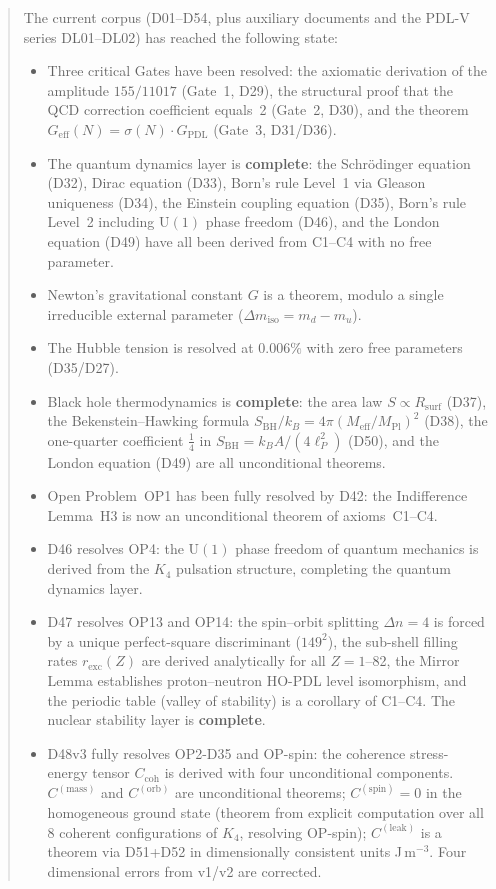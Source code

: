 \documentclass[11pt,a4paper]{article}
\theoremstyle{plain}
\theoremstyle{definition}
\theoremstyle{remark}
\newcommand{\Kfour}{K_4}
\newcommand{\Geff}{G_{\mathrm{eff}}}
\newcommand{\GPDL}{G_{\mathrm{PDL}}}
\newcommand{\Rsurf}{R_{\mathrm{surf}}}
\newcommand{\sigmaN}{\sigma(N)}
\newcommand{\SBH}{S_{\mathrm{BH}}}
\newcommand{\Meff}{M_{\mathrm{eff}}}
\newcommand{\MPl}{M_{\mathrm{Pl}}}
\newcommand{\Ccoh}{C_{\mathrm{coh}}}
\begin{document}
\begin{abstract}
The current corpus (D01--D54, plus auxiliary documents and the PDL-V series DL01--DL02) has reached the following state:
\begin{itemize}
\item Three critical Gates have been resolved: the axiomatic derivation of the amplitude $155/11017$ (Gate~1, D29), the structural proof that the QCD correction coefficient equals~2 (Gate~2, D30), and the theorem $\Geff(N)=\sigmaN\cdot\GPDL$ (Gate~3, D31/D36).
\item The quantum dynamics layer is \textbf{complete}: the Schr\"odinger equation (D32), Dirac equation (D33), Born's rule Level~1 via Gleason uniqueness (D34), the Einstein coupling equation (D35), Born's rule Level~2 including $\mathrm{U}(1)$ phase freedom (D46), and the London equation (D49) have all been derived from C1--C4 with no free parameter.
\item Newton's gravitational constant $G$ is a theorem, modulo a single irreducible external parameter ($\Delta m_{\mathrm{iso}} = m_d - m_u$).
\item The Hubble tension is resolved at $0.006\%$ with zero free parameters (D35/D27).
\item Black hole thermodynamics is \textbf{complete}: the area law $S \propto \Rsurf$ (D37), the Bekenstein--Hawking formula $\SBH/k_B = 4\pi(\Meff/\MPl)^2$ (D38), the one-quarter coefficient $\tfrac{1}{4}$ in $\SBH = k_B A/(4\ell_P^2)$ (D50), and the London equation (D49) are all unconditional theorems.
\item Open Problem~OP1 has been fully resolved by D42: the Indifference Lemma~H3 is now an unconditional theorem of axioms~C1--C4.
\item D46 resolves OP4: the $\mathrm{U}(1)$ phase freedom of quantum mechanics is derived from the $\Kfour$ pulsation structure, completing the quantum dynamics layer.
\item D47 resolves OP13 and OP14: the spin--orbit splitting $\Delta n = 4$ is forced by a unique perfect-square discriminant ($149^2$), the sub-shell filling rates $r_{\mathrm{exc}}(Z)$ are derived analytically for all $Z = 1$--82, the Mirror Lemma establishes proton--neutron HO-PDL level isomorphism, and the periodic table (valley of stability) is a corollary of C1--C4. The nuclear stability layer is \textbf{complete}.
\item D48v3 fully resolves OP2-D35 and OP-spin: the coherence stress-energy tensor $\Ccoh$ is derived with four unconditional components. $C^{(\mathrm{mass})}$ and $C^{(\mathrm{orb})}$ are unconditional theorems; $C^{(\mathrm{spin})}=0$ in the homogeneous ground state (theorem from explicit computation over all 8 coherent configurations of $K_4$, resolving OP-spin); $C^{(\mathrm{leak})}$ is a theorem via D51+D52 in dimensionally consistent units J\,m$^{-3}$. Four dimensional errors from v1/v2 are corrected.

\end{itemize}
\end{abstract}
\end{document}
